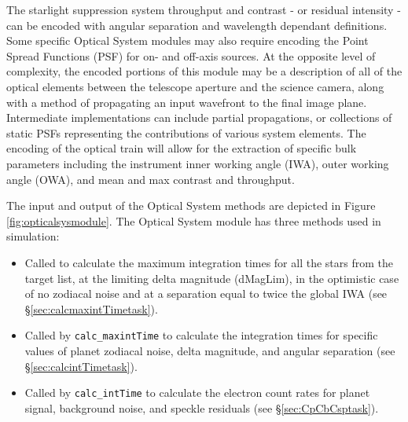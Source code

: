\documentclass[cleanfoot]{asme2ej}
\newcommand{\reffig}[1]{Figure \ref{#1}}
\begin{document}
The starlight suppression system throughput and contrast - or residual intensity - can be encoded with angular separation and wavelength dependant definitions. Some specific Optical System modules may also require encoding the Point Spread Functions (PSF) for on- and off-axis sources. At the opposite level of complexity, the encoded portions of this module may be a description of all of the optical elements between the telescope aperture and the science camera, along with a method of propagating an input wavefront to the final image plane.  Intermediate implementations can include partial propagations, or collections of static PSFs representing the contributions of various system elements.  The encoding of the optical train will allow for the extraction of specific bulk parameters including the instrument inner working angle (IWA), outer working angle (OWA), and mean and max contrast and throughput.

The input and output of the Optical System methods are depicted in \reffig{fig:opticalsysmodule}. The Optical System module has three methods used in simulation:
\begin{itemize}[leftmargin=1.5in,font={\ttfamily}]
    \item[\texttt calc\_maxintTime] Called to calculate the maximum integration times for all the stars from the target list, at the limiting delta magnitude (dMagLim), in the optimistic case of no zodiacal noise and at a separation equal to twice the global IWA (see \S\ref{sec:calcmaxintTimetask}).
    \item[\texttt calc\_intTime] Called by \verb+calc_maxintTime+ to calculate the integration times for specific values of planet zodiacal noise, delta magnitude, and angular separation (see \S\ref{sec:calcintTimetask}).
    \item[\texttt Cp\_Cb\_Csp] Called by \verb+calc_intTime+ to calculate the electron count rates for planet signal, background noise, and speckle residuals (see \S\ref{sec:CpCbCsptask}).
\end{itemize}
\end{document}

